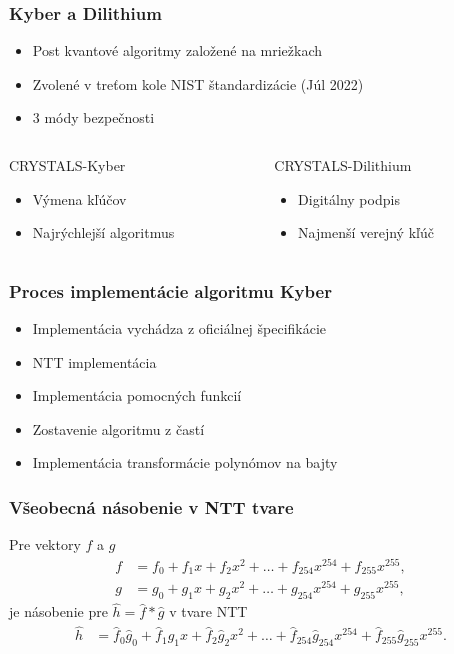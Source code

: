 \documentclass[%
  14pt,       				%
	t,                  %
	aspectratio=1610,   %
	unicode,						%
]{beamer}				    	%
\begin{document}
\begin{frame}[c]
	
	\frametitle{Kyber a Dilithium}
	\large{
		\begin{itemize}
			\item Post kvantové algoritmy založené na mriežkach
			\item Zvolené v treťom kole NIST štandardizácie (Júl 2022)
			\item 3 módy bezpečnosti
		\end{itemize}
		\vspace{3ex}
		\begin{columns}[T]
			\begin{column}{0.5\textwidth}
				CRYSTALS-Kyber
				\begin{itemize}
					\item Výmena kľúčov
					\item Najrýchlejší algoritmus
				\end{itemize}
			\end{column}
			\begin{column}{0.5\textwidth}
				CRYSTALS-Dilithium
				\begin{itemize}
					\item Digitálny podpis
					\item Najmenší verejný kľúč
				\end{itemize}
			\end{column}
		\end{columns}
	}
\end{frame}

\begin{frame}[c]
	\frametitle{Proces implementácie algoritmu Kyber}
	\large{
		\begin{itemize}
			\item Implementácia vychádza z oficiálnej špecifikácie
			\item NTT implementácia
			\item Implementácia pomocných funkcií
			\item Zostavenie algoritmu z častí
			\item Implementácia transformácie polynómov na bajty
		\end{itemize}
	}
\end{frame}

\begin{frame}[c]
	\frametitle{Všeobecná násobenie v NTT tvare}
	\large{
		Pre vektory $f$ a $g$
		\begin{align*}
			f & = f_0 + f_1x + f_2x^2 + \dots + f_{254}x^{254} + f_{255}x^{255}, \\
			g & = g_0 + g_1x + g_2x^2 + \dots + g_{254}x^{254} + g_{255}x^{255},
		\end{align*}
		je násobenie pre $\hat{h}=\hat{f}*\hat{g}$ v tvare NTT
		\begin{align*}
			\hat{h} & = \hat{f}_0\hat{g}_0 + \hat{f}_1\hat{g}_1x + \hat{f}_2\hat{g}_2x^2 + \dots + \hat{f}_{254}\hat{g}_{254}x^{254} + \hat{f}_{255}\hat{g}_{255}x^{255}.
		\end{align*}
	}
\end{frame}
\end{document}
